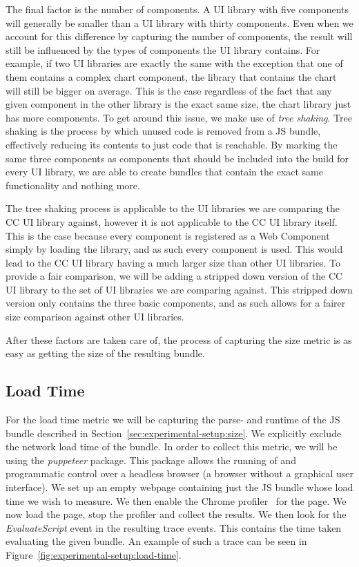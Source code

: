 The final factor is the number of components. A UI library with five components will generally be smaller than a UI library with thirty components. Even when we account for this difference by capturing the number of components, the result will still be influenced by the types of components the UI library contains. For example, if two UI libraries are exactly the same with the exception that one of them contains a complex chart component, the library that contains the chart will still be bigger on average. This is the case regardless of the fact that any given component in the other library is the exact same size, the chart library just has more components. To get around this issue, we make use of \emph{tree shaking}. Tree shaking is the process by which unused code is removed from a JS bundle, effectively reducing its contents to just code that is reachable. By marking the same three components as components that should be included into the build for every UI library, we are able to create bundles that contain the exact same functionality and nothing more.

The tree shaking process is applicable to the UI libraries we are comparing the CC UI library against, however it is not applicable to the CC UI library itself. This is the case because every component is registered as a Web Component simply by loading the library, and as such every component is used. This would lead to the CC UI library having a much larger size than other UI libraries. To provide a fair comparison, we will be adding a stripped down version of the CC UI library to the set of UI libraries we are comparing against. This stripped down version only contains the three basic components, and as such allows for a fairer size comparison against other UI libraries.

After these factors are taken care of, the process of capturing the size metric is as easy as getting the size of the resulting bundle.

\subsection{Load Time}
For the load time metric we will be capturing the parse- and runtime of the JS bundle described in Section~\ref{sec:experimental-setup:size}. We explicitly exclude the network load time of the bundle. In order to collect this metric, we will be using the \emph{puppeteer} package. This package allows the running of and programmatic control over a headless browser (a browser without a graphical user interface). We set up an empty webpage containing just the JS bundle whose load time we wish to measure. We then enable the Chrome profiler~ for the page. We now load the page, stop the profiler and collect the results. We then look for the \emph{EvaluateScript} event in the resulting trace events. This contains the time taken evaluating the given bundle. An example of such a trace can be seen in Figure~\ref{fig:experimental-setup:load-time}.

